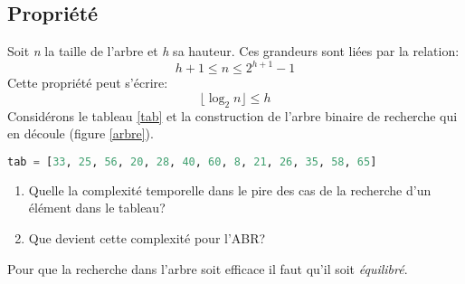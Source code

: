 \documentclass[a4paper,11pt]{article}
\begin{document}
\begin{Form}
\subsection{Propriété}
Soit \emph{n} la taille de l'arbre et \emph{h} sa hauteur. Ces grandeurs sont liées par la relation:
$$h+1 \leq n \leq 2^{h+1}-1$$
Cette propriété peut s'écrire:
$$ \lfloor \log_2 n  \rfloor \leq h$$
Considérons le tableau \ref{tab} et la construction de l'arbre binaire de recherche qui en découle (figure \ref{arbre}).
\begin{center}
\begin{lstlisting}[language=Python]
tab = [33, 25, 56, 20, 28, 40, 60, 8, 21, 26, 35, 58, 65]
\end{lstlisting}
\label{tab}
\end{center}
\begin{activite}
\begin{enumerate}
\item Quelle la complexité temporelle dans le pire des cas de la recherche d'un élément dans le tableau?
\item Que devient cette complexité pour l'ABR?
\end{enumerate}
\end{activite}
\begin{aretenir}[Remarque]
Pour que la recherche dans l'arbre soit efficace il faut qu'il soit \emph{équilibré}.
\end{aretenir}

\end{Form}
\end{document}

